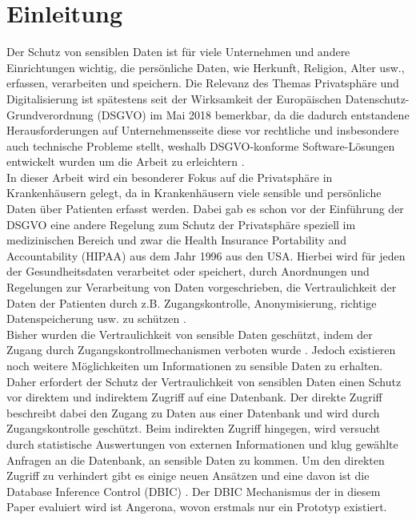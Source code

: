 \documentclass[german,version-2020-11]{uzl-thesis}
\begin{document}
\chapter{Einleitung}
Der Schutz von sensiblen Daten ist für viele Unternehmen und andere Einrichtungen wichtig, die persönliche Daten, wie Herkunft, Religion, Alter usw., erfassen, verarbeiten und speichern. Die Relevanz des Themas Privatsphäre und Digitalisierung ist spätestens seit der Wirksamkeit der Europäischen Datenschutz-Grundverordnung (DSGVO) \cite{1} im  Mai 2018 bemerkbar, da die dadurch entstandene Herausforderungen auf Unternehmensseite diese vor rechtliche und insbesondere auch technische Probleme stellt, weshalb DSGVO-konforme Software-Lösungen entwickelt wurden um die Arbeit zu erleichtern \cite{9}.\\ 
In dieser Arbeit wird ein besonderer Fokus auf die Privatsphäre in Krankenhäusern gelegt, da in Krankenhäusern viele sensible und persönliche Daten über Patienten erfasst werden. Dabei gab es schon vor der Einführung der DSGVO eine andere Regelung zum Schutz der Privatsphäre speziell im medizinischen Bereich und zwar die Health Insurance Portability and Accountability (HIPAA) aus dem Jahr 1996 aus den USA. Hierbei wird für jeden der Gesundheitsdaten verarbeitet oder speichert, durch Anordnungen und Regelungen zur Verarbeitung von Daten vorgeschrieben, die Vertraulichkeit der Daten der Patienten durch z.B. Zugangskontrolle, Anonymisierung, richtige Datenspeicherung usw. zu schützen \cite{7}.\\
Bisher wurden die Vertraulichkeit von sensible Daten geschützt, indem der Zugang durch Zugangskontrollmechanismen verboten wurde \cite{2}. Jedoch existieren noch weitere Möglichkeiten um Informationen zu sensible Daten zu erhalten. Daher erfordert der Schutz der Vertraulichkeit von sensiblen Daten einen Schutz vor direktem und indirektem Zugriff auf eine Datenbank. Der direkte Zugriff beschreibt dabei den Zugang zu Daten aus einer Datenbank und wird durch Zugangskontrolle geschützt. Beim indirekten Zugriff hingegen, wird versucht durch statistische Auswertungen von externen Informationen und klug gewählte Anfragen an die Datenbank, an sensible Daten zu kommen. Um den direkten Zugriff zu verhindert gibt es einige neuen Ansätzen und eine davon ist die Database Inference Control (DBIC) \cite{22}. Der DBIC Mechanismus der in diesem Paper evaluiert wird ist Angerona, wovon erstmals nur ein Prototyp existiert. \\ 
\end{document}
